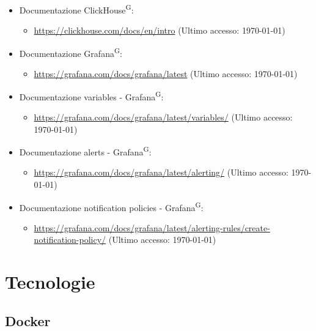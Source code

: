 \documentclass[8pt]{article}
\newcommand{\glossterm}[1]{#1\textsuperscript{G}} %
\begin{document}
\begin{itemize}
\begin{itemize}
		\item \href{https://nightlies.apache.org/flink/flink-docs-stable/}{\color{myblue}https://nightlies.apache.org/flink/flink-docs-stable/} (Ultimo accesso: \today)
	\end{itemize}
    \item Documentazione \glossterm{ClickHouse}:
    \begin{itemize}
		\item \href{https://clickhouse.com/docs/en/intro}{\color{myblue}https://clickhouse.com/docs/en/intro} (Ultimo accesso: \today)
	\end{itemize}
    \item Documentazione \glossterm{Grafana}:
    \begin{itemize}
		\item \href{https://grafana.com/docs/grafana/latest}{\color{myblue}https://grafana.com/docs/grafana/latest} (Ultimo accesso: \today)
	\end{itemize}
    \item Documentazione variables - \glossterm{Grafana}:
    \begin{itemize}
		\item \href{https://grafana.com/docs/grafana/latest/variables/}{\color{myblue}https://grafana.com/docs/grafana/latest/variables/} (Ultimo accesso: \today)
	\end{itemize}
    \item Documentazione alerts - \glossterm{Grafana}:
    \begin{itemize}
		\item \href{https://grafana.com/docs/grafana/latest/alerting/}{\color{myblue}https://grafana.com/docs/grafana/latest/alerting/} (Ultimo accesso: \today)
	\end{itemize}
    \item Documentazione notification policies - \glossterm{Grafana}:
    \begin{itemize}
		\item \href{https://grafana.com/docs/grafana/latest/alerting-rules/create-notification-policy/}{\color{myblue}https://grafana.com/docs/grafana/latest/alerting-rules/create-notification-policy/} (Ultimo accesso: \today)
	\end{itemize}
\end{itemize}
\clearpage
\section{Tecnologie}
\subsection{Docker}
\end{document}
